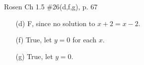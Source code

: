 \documentclass[12pt,addpoints]{exam}
\begin{document}
\begin{questions}
\question Rosen Ch 1.5 \#26(d,f,g), p. 67
    \ifprintanswers
        \vspace{-10pt}
    \fi
\begin{solution}
    \begin{itemize}[itemsep=0pt,parsep=0pt,topsep=0pt,partopsep=0pt]
        \item[(d)] F, since no solution to $x + 2 = x - 2$.
        \item[(f)] True, let $y=0$ for each $x$.
        \item[(g)] True, let $y = 0$.
    \end{itemize}
\end{solution}



\end{questions}
\end{document}
